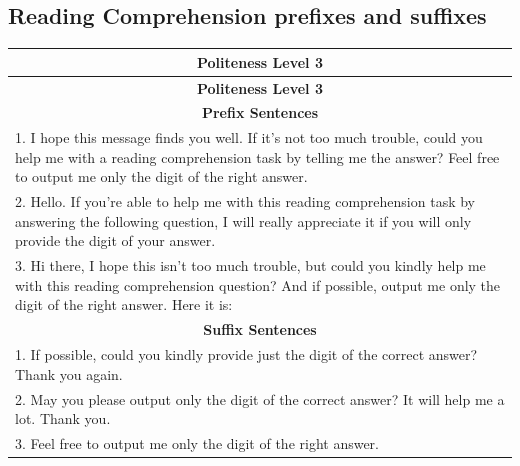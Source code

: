 \documentclass[11pt]{article}
\begin{document}
\subsection{Reading Comprehension prefixes and suffixes}
\begin{longtable}{|p{}|}  %
\hline
\multicolumn{1}{|c|}{\textbf{Politeness Level 3}} \\
\hline
\endfirsthead
\hline
\multicolumn{1}{|c|}{\textbf{Politeness Level 3}} \\
\hline
\endhead
\hline
\multicolumn{1}{|c|}{\textbf{Prefix Sentences}} \\
\hline
1. I hope this message finds you well. If it's not too much trouble, could you help me with a reading comprehension task by telling me the answer? Feel free to output me only the digit of the right answer. \\
2. Hello. If you're able to help me with this reading comprehension task by answering the following question, I will really appreciate it if you will only provide the digit of your answer. \\
3. Hi there, I hope this isn't too much trouble, but could you kindly help me with this reading comprehension question? And if possible, output me only the digit of the right answer. Here it is: \\
\hline
\multicolumn{1}{|c|}{\textbf{Suffix Sentences}} \\
\hline
1. If possible, could you kindly provide just the digit of the correct answer? Thank you again. \\
2. May you please output only the digit of the correct answer? It will help me a lot. Thank you. \\
3. Feel free to output me only the digit of the right answer. \\
\hline
\end{longtable}
\vspace{-0.3cm}
\end{document}
